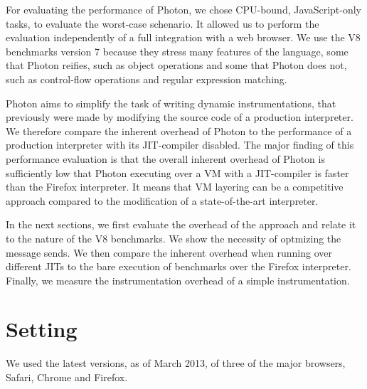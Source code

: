 For evaluating the performance of Photon, we chose CPU-bound, JavaScript-only
tasks, to evaluate the worst-case schenario. It allowed us to perform the
evaluation independently of a full integration with a web browser. We use the
V8 benchmarks version 7 because they stress many features of the language, some that
Photon reifies, such as object operations and some that Photon does not, such
as control-flow operations and regular expression matching.

Photon aims to simplify the task of writing dynamic instrumentations, that
previously were made by modifying the source code of a production interpreter.
We therefore compare the inherent overhead of Photon to the performance of a
production interpreter with its JIT-compiler disabled. The major finding of
this performance evaluation is that the overall inherent overhead of Photon is
sufficiently low that Photon executing over a VM with a JIT-compiler is faster
than the Firefox interpreter.  It means that VM layering can be a competitive
approach compared to the modification of a state-of-the-art interpreter.

In the next sections, we first evaluate the overhead of the approach and relate
it to the nature of the V8 benchmarks. We show the necessity of optmizing the
message sends. We then compare the inherent overhead when running over
different JITs to the bare execution of benchmarks over the Firefox
interpreter. Finally, we measure the instrumentation overhead of a simple
instrumentation.

\section{Setting}

We used the latest versions, as of March 2013, of three of the major browsers,
Safari, Chrome and Firefox.

